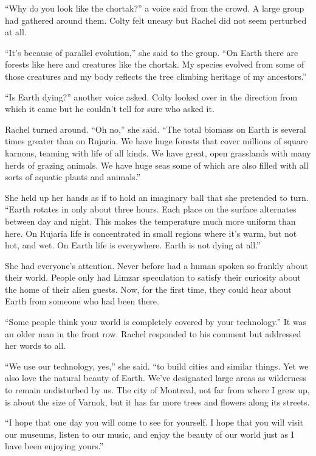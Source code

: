
``Why do you look like the chortak?'' a voice said from the crowd. A large group had gathered
around them. Colty felt uneasy but Rachel did not seem perturbed at all.

``It's because of parallel evolution,'' she said to the group. ``On Earth there are forests like
here and creatures like the chortak. My species evolved from some of those creatures and my body
reflects the tree climbing heritage of my ancestors.''

``Is Earth dying?'' another voice asked. Colty looked over in the direction from which it came
but he couldn't tell for sure who asked it.

Rachel turned around. ``Oh no,'' she said. ``The total biomass on Earth is several times greater
than on Rujaria. We have huge forests that cover millions of square karnons, teaming with life
of all kinds. We have great, open grasslands with many herds of grazing animals. We have huge
seas some of which are also filled with all sorts of aquatic plants and animals.''

She held up her hands as if to hold an imaginary ball that she pretended to turn. ``Earth
rotates in only about three hours. Each place on the surface alternates between day and night.
This makes the temperature much more uniform than here. On Rujaria life is concentrated in small
regions where it's warm, but not hot, and wet. On Earth life is everywhere. Earth is not dying
at all.''


She had everyone's attention. Never before had a human spoken so frankly about their world.
People only had Limzar speculation to satisfy their curiosity about the home of their alien
guests. Now, for the first time, they could hear about Earth from someone who had been there.

``Some people think your world is completely covered by your technology.'' It was an older man
in the front row. Rachel responded to his comment but addressed her words to all.

``We use our technology, yes,'' she said. ``to build cities and similar things. Yet we also love
the natural beauty of Earth. We've designated large areas as wilderness to remain undisturbed by
us. The city of Montreal, not far from where I grew up, is about the size of Varnok, but it has
far more trees and flowers along its streets.

``I hope that one day you will come to see for yourself. I hope that you will visit our museums,
listen to our music, and enjoy the beauty of our world just as I have been enjoying yours.''

